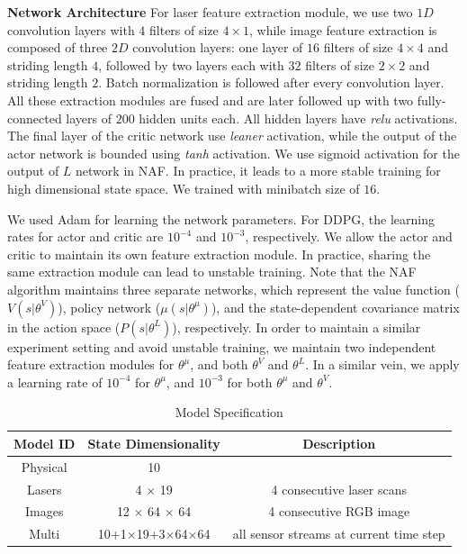 \documentclass[../thesis.tex]{subfiles}
\begin{document}
\textbf{Network Architecture}
For laser feature extraction module, we use two $1D$ convolution layers with $4$ filters of size $4 \times 1$, while image feature extraction is composed of three $2D$ convolution layers: one layer of $16$ filters of size $4 \times 4$ and striding length $4$, followed by two layers each with $32$ filters of size $2 \times 2 $ and striding length $2$. Batch normalization is followed after every convolution layer. All these extraction modules are fused and are later followed up with two fully-connected layers of $200$ hidden units each. All hidden layers have \emph{relu} activations. The final layer of the critic network use \emph{leaner} activation, while the output of the actor network is bounded using \emph{tanh} activation. We use sigmoid activation for the output of $L$ network in NAF. In practice, it leads to a more stable training for high dimensional state space. We trained with minibatch size of $16$.
 
We used Adam \cite{adam} for learning the network parameters. For DDPG, the learning rates for actor and critic are $10^{-4}$ and $10^{-3}$, respectively. We allow the actor and critic to maintain its own feature extraction module. In practice, sharing the same extraction module can lead to unstable training. Note that the NAF algorithm maintains three separate networks, which represent the value function ($V(s|\theta^V)$), policy network ($\mu(s|\theta^\mu)$), and the state-dependent covariance matrix in the action space ($P(s|\theta^L)$), respectively. In order to maintain a similar experiment setting and avoid unstable training, we maintain two independent feature extraction modules for $\theta^\mu$, and both $\theta^V$ and $\theta^L$. In a similar vein, we apply a learning rate of $10^{-4}$ for $\theta^\mu$, and $10^{-3}$ for both  $\theta^\mu$ and $\theta^V$.
 
\begin{table}[t]
	\vskip 0.1in
	\caption{Model Specification}
	\label{table:model-spec}
	\vskip 0.1in
	\centering
	\begin{small}
	\begin{tabular}{ccc}
	\toprule
    \centering
	Model ID & State Dimensionality & Description \\ \midrule \midrule
	Physical & 10 & \\
	Lasers & 4 $\times$ 19 & 4 consecutive laser scans \\
	Images & 12 $\times$ 64 $\times$ 64 & 4 consecutive RGB image \\
	Multi  & 10+1$\times$19+3$\times$64$\times$64 & all sensor streams at current time step \\ \toprule
	\end{tabular}
	\end{small}
\end{table}
 
\end{document}
